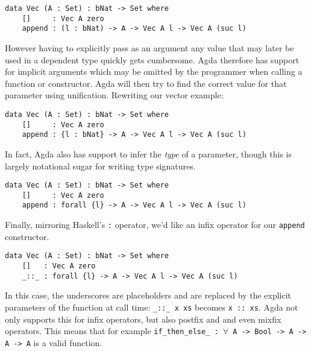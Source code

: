 \begin{lstlisting}[caption={A Simple Vector Type},label={lst:tutorial:vec},emph={Vec,append}]
data Vec (A : Set) : bNat -> Set where
    []     : Vec A zero
    append : (l : bNat) -> A -> Vec A l -> Vec A (suc l)
\end{lstlisting}

However having to explicitly pass as an argument any value that may later be used in a dependent type quickly gets cumbersome. Agda therefore has support for implicit arguments which may be omitted by the programmer when calling a function or constructor. Agda will then try to find the correct value for that parameter using unification. Rewriting our vector example:

\begin{lstlisting}[caption={A Simple Vector Type, Take Two},label={lst:tutorial:vec:2},emph={Vec,append}]
data Vec (A : Set) : bNat -> Set where
    []     : Vec A zero
    append : {l : bNat} -> A -> Vec A l -> Vec A (suc l)
\end{lstlisting}

In fact, Agda also has support to infer the \emph{type} of a parameter, though this is largely notational sugar for writing type signatures.

\begin{lstlisting}[caption={A Simple Vector Type, Take Three},label={lst:tutorial:vec:3},emph={Vec,append}]
data Vec (A : Set) : bNat -> Set where
    []     : Vec A zero
    append : forall {l} -> A -> Vec A l -> Vec A (suc l)
\end{lstlisting}

Finally, mirroring Haskell's \texttt{:} operator, we'd like an infix operator for our \texttt{append} constructor.

\begin{lstlisting}[caption={A Simple Vector Type, Take Four},label={lst:tutorial:vec:4},emph={Vec}]
data Vec (A : Set) : bNat -> Set where
    []   : Vec A zero
    _::_ : forall {l} -> A -> Vec A l -> Vec A (suc l)
\end{lstlisting}

In this case, the underscores are placeholders and are replaced by the explicit parameters of the function at call time: \texttt{\_::\_ x xs} becomes \texttt{x :: xs}. Agda not only supports this for infix operators, but also postfix and and even mixfix operators. This means that for example \texttt{if\_then\_else\_ : $\forall$ {A} -> Bool -> A -> A -> A} is a valid function.

